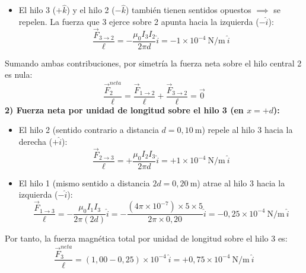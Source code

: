 \begin{ejercicio}
\begin{itemize}[leftmargin=*]
    \begin{equation}
        \frac{\vec{F}_{1 \to 2}}{\ell} = +\frac{\mu_0 I_1 I_2}{2\pi d}\hat{i} = \frac{(4\pi \times 10^{-7}) \times 5 \times 10}{2\pi \times 0{,}10}\hat{i} = +1 \times 10^{-4}\ \si{\newton\per\meter}\ \hat{i}
    \end{equation}
    \item El hilo 3 ($+\hat{k}$) y el hilo 2 ($-\hat{k}$) también tienen sentidos opuestos $\implies$ se repelen. La fuerza que 3 ejerce sobre 2 apunta hacia la izquierda ($-\hat{i}$):
    \begin{equation}
        \frac{\vec{F}_{3 \to 2}}{\ell} = -\frac{\mu_0 I_3 I_2}{2\pi d}\hat{i} = -1 \times 10^{-4}\ \si{\newton\per\meter}\ \hat{i}
    \end{equation}
\end{itemize}
Sumando ambas contribuciones, por simetría la fuerza neta sobre el hilo central 2 es nula:
\begin{equation}
    \frac{\vec{F}_2^{neta}}{\ell} = \frac{\vec{F}_{1 \to 2}}{\ell} + \frac{\vec{F}_{3 \to 2}}{\ell} = \vec{0}
\end{equation}
\textbf{2) Fuerza neta por unidad de longitud sobre el hilo 3 (en $x = +d$):}
\begin{itemize}[leftmargin=*]
    \item El hilo 2 (sentido contrario a distancia $d = 0{,}10\ \si{\meter}$) repele al hilo 3 hacia la derecha ($+\hat{i}$):
    \begin{equation}
        \frac{\vec{F}_{2 \to 3}}{\ell} = +\frac{\mu_0 I_2 I_3}{2\pi d}\hat{i} = +1 \times 10^{-4}\ \si{\newton\per\meter}\ \hat{i}
    \end{equation}
    \item El hilo 1 (mismo sentido a distancia $2d = 0{,}20\ \si{\meter}$) atrae al hilo 3 hacia la izquierda ($-\hat{i}$):
    \begin{equation}
        \frac{\vec{F}_{1 \to 3}}{\ell} = -\frac{\mu_0 I_1 I_3}{2\pi (2d)}\hat{i} = -\frac{(4\pi \times 10^{-7}) \times 5 \times 5}{2\pi \times 0{,}20}\hat{i} = -0{,}25 \times 10^{-4}\ \si{\newton\per\meter}\ \hat{i}
    \end{equation}
\end{itemize}
Por tanto, la fuerza magnética total por unidad de longitud sobre el hilo 3 es:
\begin{equation}
    \boxed{\frac{\vec{F}_3^{neta}}{\ell} = (1{,}00 - 0{,}25) \times 10^{-4}\ \hat{i} = +0{,}75 \times 10^{-4}\ \si{\newton\per\meter}\ \hat{i}}
\end{equation}
\end{ejercicio}
